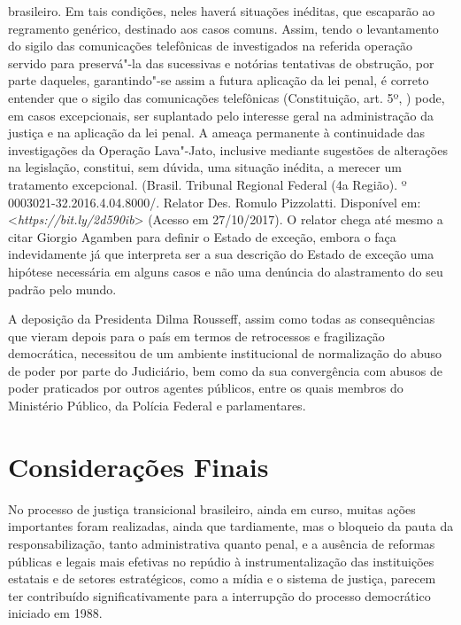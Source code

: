 {{  brasileiro. Em tais condições, neles haverá situações inéditas, que
  escaparão ao regramento genérico, destinado aos casos comuns. Assim,
  tendo o levantamento do sigilo das comunicações telefônicas de
  investigados na referida operação servido para preservá"-la das
  sucessivas e notórias tentativas de obstrução, por parte daqueles,
  garantindo"-se assim a futura aplicação da lei penal, é correto
  entender que o sigilo das comunicações telefônicas (Constituição, art.
  5º, ) pode, em casos excepcionais, ser suplantado pelo interesse
  geral na administração da justiça e na aplicação da lei penal. A
  ameaça permanente à continuidade das investigações da Operação
  Lava"-Jato, inclusive mediante sugestões de alterações na legislação,
  constitui, sem dúvida, uma situação inédita, a merecer um tratamento
  excepcional.} (Brasil. Tribunal Regional Federal (4a Região). 
    º 0003021-32.2016.4.04.8000/. Relator Des. Romulo
  Pizzolatti. Disponível em: \textless{}\emph{https://bit.ly/2d590ib}\textgreater{}
  (Acesso em 27/10/2017).} O relator chega até mesmo a citar Giorgio
Agamben para definir o Estado de exceção, embora o faça indevidamente já
que interpreta ser a sua descrição do Estado de exceção uma hipótese
necessária em alguns casos e não uma denúncia do alastramento do seu
padrão pelo mundo.

A deposição da Presidenta Dilma Rousseff, assim como todas as
consequências que vieram depois para o país em termos de retrocessos e
fragilização democrática, necessitou de um ambiente institucional de
normalização do abuso de poder por parte do Judiciário, bem como da sua
convergência com abusos de poder praticados por outros agentes públicos,
entre os quais membros do Ministério Público, da Polícia Federal e
parlamentares.

\section{Considerações Finais}

No processo de justiça transicional brasileiro, ainda em curso, muitas
ações importantes foram realizadas, ainda que tardiamente, mas o
bloqueio da pauta da responsabilização, tanto administrativa quanto
penal, e a ausência de reformas públicas e legais mais efetivas no
repúdio à instrumentalização das instituições estatais e de setores
estratégicos, como a mídia e o sistema de justiça, parecem ter
contribuído significativamente para a interrupção do processo
democrático iniciado em 1988.

